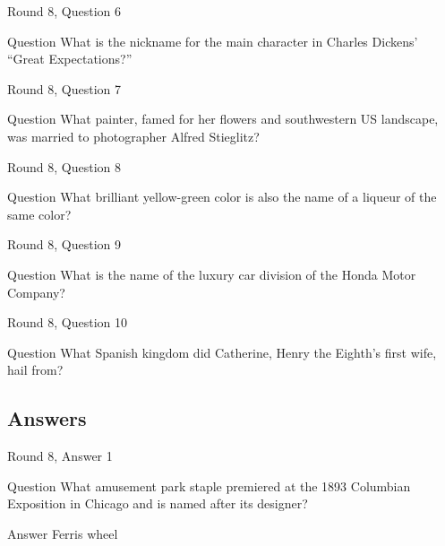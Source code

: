 \documentclass[11pt]{beamer}
\begin{document}
\begin{frame}{Round 8, Question 6}
\begin{block}{Question}
What is the nickname for the main character in Charles Dickens' ``Great Expectations?''
\end{block}
\end{frame}
    

\begin{frame}{Round 8, Question 7}
\begin{block}{Question}
What painter, famed for her flowers and southwestern US landscape, was married to photographer Alfred Stieglitz\@?
\end{block}
\end{frame}
    

\begin{frame}{Round 8, Question 8}
\begin{block}{Question}
What brilliant yellow-green color is also the name of a liqueur of the same color\@?
\end{block}
\end{frame}
    

\begin{frame}{Round 8, Question 9}
\begin{block}{Question}
What is the name of the luxury car division of the Honda Motor Company\@?
\end{block}
\end{frame}
    

\begin{frame}{Round 8, Question 10}
\begin{block}{Question}
What Spanish kingdom did Catherine, Henry the Eighth's first wife, hail from\@?
\end{block}
\end{frame}
    
\subsection{Answers}

\begin{frame}{Round 8, Answer 1}
\begin{block}{Question}
What amusement park staple premiered at the 1893 Columbian Exposition in Chicago and is named after its designer\@?
\end{block}
\pause{}
\begin{block}{Answer}
Ferris wheel
\end{block}
\end{frame}
    
\end{document}
